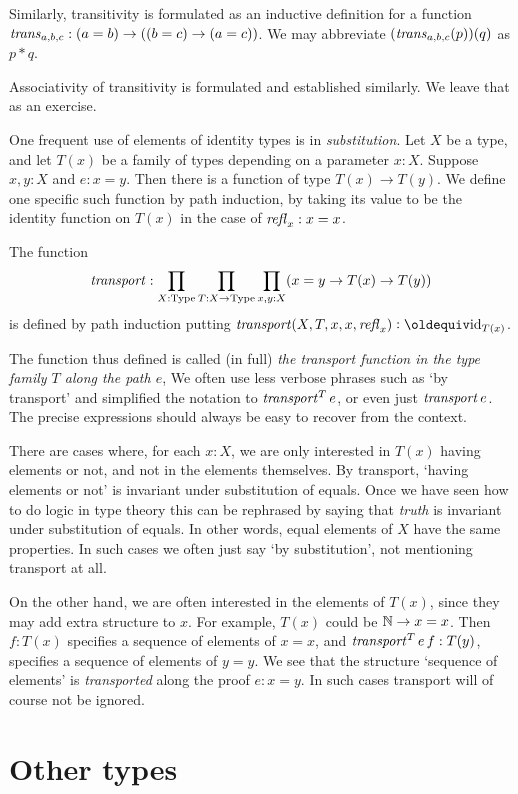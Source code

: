 Similarly, transitivity is formulated as an inductive definition for a function $\mathop{\mathit{trans}}_{a,b,c} : (a=b) \to ((b=c) \to (a=c))$.  We may
abbreviate $(\mathop{\mathit{trans}}_{a,b,c}(p))(q)$ as $p*q$.

Associativity of transitivity is formulated and established similarly.  We leave that as an exercise.

One frequent use of elements of identity types is in \emph{substitution}.  Let $X$ be a type, and let $T(x)$ be a family of types depending on a
parameter $x:X$.  Suppose $x,y:X$ and $e:x=y$.  Then there is a function of type $T(x) \to T(y)$. We define one specific such function by path induction, by taking its value
to be the identity function on $T(x)$ in the case of $\mathop{{\it refl}_{x}}:x=x$.
\begin{definition}\label{def:transport} The function
\[ 
\mathop{\mathit{transport}} : \prod_{X:\mathord{\mathrm{Type}}} \prod_{T: X\to \mathord{\mathrm{Type}}} \prod_{x,y:X} (x=y \to T(x) \to T(y))
\]
is defined by path induction putting $\trp(X,T,x,x,\refl{x})\defeq \id_{T(x)}$.
\end{definition} 
The function thus defined is called (in full)
\emph{the transport function in the type family $T$ along the path $e$},
We often use less verbose phrases such as `by transport'
and simplified the notation to $\mathop{\mathit{transport}}^T e$, or even just $\mathop{\mathit{transport}} e$.
The precise expressions should always be easy to recover from the context.

There are cases where, for each $x:X$, we are only interested in 
$T(x)$ having elements or not, and not in the elements themselves.
By transport, `having elements or not' is invariant under 
substitution of equals.
Once we have seen how to do logic in type theory this can be rephrased
by saying that \emph{truth} is invariant under substitution of equals.
In other words, equal elements of $X$ have the same properties.
In such cases we often just say `by substitution', not mentioning
transport at all.  

On the other hand, we are often interested in the elements of $T(x)$,
since they may add extra structure to $x$. For example,
$T(x)$ could be $\mathbb{N}\to x=x$. Then $f:T(x)$ specifies a sequence
of elements of $x=x$, and $\mathop{\mathit{transport}}^T e\,f : T(y)$, specifies a sequence
of elements of $y=y$. We see that the structure `sequence of elements'
is \emph{transported} along the proof $e:x=y$. 
In such cases transport will of course not be ignored.

\section{Other types}
\label{sec:other-types}

